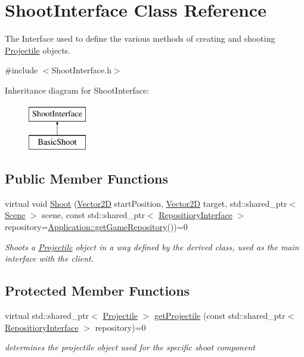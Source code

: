\hypertarget{class_shoot_interface}{}\section{Shoot\+Interface Class Reference}
\label{class_shoot_interface}


The Interface used to define the various methods of creating and shooting \hyperlink{class_projectile}{Projectile} objects.  




{\ttfamily \#include $<$Shoot\+Interface.\+h$>$}

Inheritance diagram for Shoot\+Interface\+:\begin{figure}[H]
\begin{center}
\leavevmode
\includegraphics[height=2.000000cm]{d9/d8a/class_shoot_interface}
\end{center}
\end{figure}
\subsection*{Public Member Functions}
\begin{DoxyCompactItemize}
\item 
virtual void \hyperlink{class_shoot_interface_a3e8003c123f8f6c43c12a9afc29356b8}{Shoot} (\hyperlink{class_vector2_d}{Vector2D} start\+Position, \hyperlink{class_vector2_d}{Vector2D} target, std\+::shared\+\_\+ptr$<$ \hyperlink{class_scene}{Scene} $>$ scene, const std\+::shared\+\_\+ptr$<$ \hyperlink{class_repositiory_interface}{Repositiory\+Interface} $>$ repository=\hyperlink{class_application_aa895ae75cdb47ab91584c32b0db0ca06}{Application\+::get\+Game\+Repository}())=0
\begin{DoxyCompactList}\small\item\em Shoots a \hyperlink{class_projectile}{Projectile} object in a way defined by the derived class, used as the main interface with the client. \end{DoxyCompactList}\end{DoxyCompactItemize}
\subsection*{Protected Member Functions}
\begin{DoxyCompactItemize}
\item 
virtual std\+::shared\+\_\+ptr$<$ \hyperlink{class_projectile}{Projectile} $>$ \hyperlink{class_shoot_interface_ab93ccb6b21911e121b19dc15196a4e0b}{get\+Projectile} (const std\+::shared\+\_\+ptr$<$ \hyperlink{class_repositiory_interface}{Repositiory\+Interface} $>$ repository)=0
\begin{DoxyCompactList}\small\item\em determines the projectile object used for the specific shoot component \end{DoxyCompactList}\end{DoxyCompactItemize}


